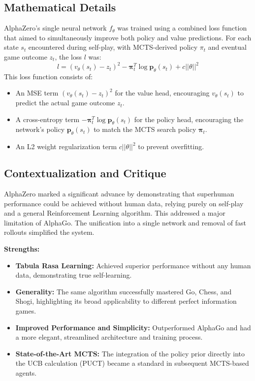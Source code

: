 \documentclass[11pt,a4paper]{article}
\begin{document}
\subsection{Mathematical Details}
AlphaZero's single neural network $f_{\theta}$ was trained using a combined loss function that aimed to simultaneously improve both policy and value predictions. For each state $s_t$ encountered during self-play, with MCTS-derived policy $\pi_t$ and eventual game outcome $z_t$, the loss $l$ was:
\[ l = (v_{\theta}(s_t) - z_t)^2 - \boldsymbol{\pi}_t^T \log \mathbf{p}_{\theta}(s_t) + c ||\theta||^2 \]
This loss function consists of:
\begin{itemize}
    \item An MSE term $(v_{\theta}(s_t) - z_t)^2$ for the value head, encouraging $v_{\theta}(s_t)$ to predict the actual game outcome $z_t$.
    \item A cross-entropy term $-\boldsymbol{\pi}_t^T \log \mathbf{p}_{\theta}(s_t)$ for the policy head, encouraging the network's policy $\mathbf{p}_{\theta}(s_t)$ to match the MCTS search policy $\boldsymbol{\pi}_t$.
    \item An L2 weight regularization term $c||\theta||^2$ to prevent overfitting.
\end{itemize}

\subsection{Contextualization and Critique}
AlphaZero marked a significant advance by demonstrating that superhuman performance could be achieved without human data, relying purely on self-play and a general Reinforcement Learning algorithm. This addressed a major limitation of AlphaGo. The unification into a single network and removal of fast rollouts simplified the system.

\textbf{Strengths:}
\begin{itemize}
    \item \textbf{Tabula Rasa Learning:} Achieved superior performance without any human data, demonstrating true self-learning.
    \item \textbf{Generality:} The same algorithm successfully mastered Go, Chess, and Shogi, highlighting its broad applicability to different perfect information games.
    \item \textbf{Improved Performance and Simplicity:} Outperformed AlphaGo and had a more elegant, streamlined architecture and training process.
    \item \textbf{State-of-the-Art MCTS:} The integration of the policy prior directly into the UCB calculation (PUCT) became a standard in subsequent MCTS-based agents.
\end{itemize}
\end{document}
